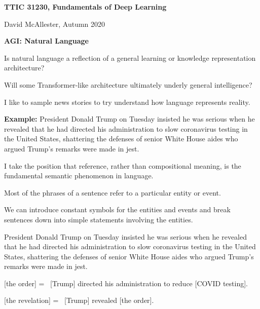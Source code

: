 

\def\entity#1{\vfill {[#1] =~}}



{\Huge

  \centerline{\bf TTIC 31230, Fundamentals of Deep Learning}
  \bigskip
  \centerline{David McAllester, Autumn 2020}

\vfill
\centerline{\bf AGI: Natural Language}
  \vfill
  \vfill



Is natural language a reflection of a general learning or knowledge representation architecture?

\vfill
Will some Transformer-like architecture ultimately underly general intelligence?


I like to sample news stories to try understand how language represents reality.

\vfill
{\bf Example:} President Donald Trump on Tuesday insisted he was serious when he %
revealed that he had directed his administration to slow coronavirus %
testing in the United States, shattering the defenses of senior White %
House aides who argued Trump’s remarks were made in jest. %


I take the position that reference, rather than compositional meaning, is the fundamental semantic phenomenon in language.

\vfill
Most of the phrases of a sentence refer to a particular entity or event.

\vfill
We can introduce constant symbols for the entities and events and break sentences down into simple
statements involving the entities.


{\huge


\vfill
President Donald Trump on Tuesday insisted he was serious when he %
revealed that he had directed his administration to slow coronavirus %
testing in the United States, shattering the defenses of senior White %
House aides who argued Trump’s remarks were made in jest. %

\entity{the order} [Trump] directed his administration to reduce [{\large COVID} testing].

\entity{the revelation} [Trump] revealed [the order].

}}

